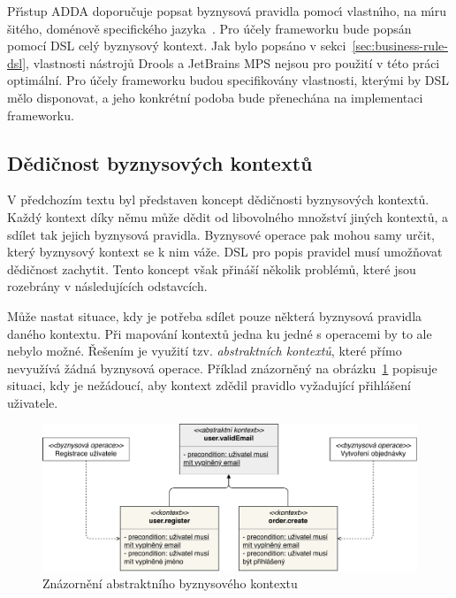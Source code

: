 Př\'{\i}stup \gls{ADDA} doporučuje popsat byznysová pravidla pomoc\'{\i}
vlastn\'{\i}ho, na m\'{\i}ru šitého, doménově specifického jazyka~\cite{cemus2015automated}.
Pro účely frameworku bude popsán pomocí \gls{DSL} celý byznysový kontext.
Jak bylo popsáno v sekci~\ref{sec:business-rule-dsl}, vlastnosti nástrojů Drools a JetBrains MPS
nejsou pro použití v této práci optimální. Pro účely frameworku budou specifikovány vlastnosti,
kterými by \gls{DSL} mělo disponovat, a jeho konkrétní podoba bude přenechána na implementaci
frameworku.

\subsection{Dědičnost byznysových kontextů}\label{sec:context-inheritance}

V předchozím textu byl představen koncept dědičnosti byznysových kontextů.
Každý kontext díky němu může dědit od libovolného množství jiných kontextů,
a sdílet tak jejich byznysová pravidla. Byznysové operace pak mohou samy určit,
který byznysový kontext se k nim váže. \gls{DSL} pro popis pravidel musí umožňovat
dědičnost zachytit. Tento koncept však přináší několik problémů, které jsou rozebrány
v následujících odstavcích.

Může nastat situace, kdy je potřeba sdílet pouze některá byznysová pravidla
daného kontextu. Při mapování kontextů jedna ku jedné s operacemi by to ale
nebylo možné. Řešením je využití tzv. \textit{abstraktních kontextů},
které přímo nevyužívá žádná byznysová operace. Příklad znázorněný na
obrázku~\ref{fig:abstract-context} popisuje situaci, kdy je nežádoucí,
aby kontext  zdědil pravidlo vyžadující přihlášení uživatele.

\begin{figure}
    \centering
    \includegraphics[keepaspectratio=true, width=1\linewidth]{figures/abstract-context.pdf}
    \caption{Znázornění abstraktního byznysového kontextu}
    \label{fig:abstract-context}
\end{figure}

